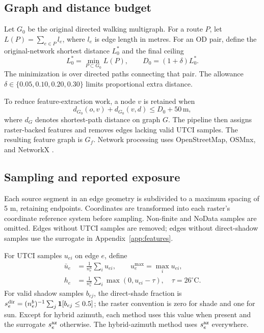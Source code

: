 \documentclass[sigconf,nonacm]{acmart}
\begin{document}
\subsection{Graph and distance budget}
Let $G_0$ be the original directed walking multigraph. For a route $P$, let $L(P)=\sum_{e\in P}l_e$, where $l_e$ is edge length in metres. For an OD pair, define the original-network shortest distance $L_0^*$ and the final ceiling
\begin{equation}
 L_0^*=\min_{P\subset G_0} L(P),\qquad D_0=(1+\delta)L_0^*.
\end{equation}
The minimization is over directed paths connecting that pair. The allowance $\delta\in\{0.05,0.10,0.20,0.30\}$ limits proportional extra distance.

To reduce feature-extraction work, a node $v$ is retained when
\begin{equation}
 d_{G_0}(o,v)+d_{G_0}(v,d)\leq D_0+50\,\mathrm{m},
\end{equation}
where $d_G$ denotes shortest-path distance on graph $G$. The pipeline then assigns raster-backed features and removes edges lacking valid UTCI samples. The resulting feature graph is $G_f$. Network processing uses OpenStreetMap, OSMnx, and NetworkX \citep{osm2026,boeing2017,hagberg2008}.

\subsection{Sampling and reported exposure}
Each source segment in an edge geometry is subdivided to a maximum spacing of 5 m, retaining endpoints. Coordinates are transformed into each raster's coordinate reference system before sampling. Non-finite and NoData samples are omitted. Edges without UTCI samples are removed; edges without direct-shadow samples use the surrogate in Appendix~\ref{app:features}.

For UTCI samples $u_{ei}$ on edge $e$, define
\begin{align}
 \bar u_e&=\frac{1}{n_e^u}\sum_i u_{ei},\qquad u_e^{\max}=\max_i u_{ei},\\
 h_e&=\frac{1}{n_e^u}\sum_i\max(0,u_{ei}-\tau),\quad \tau=26^\circ\mathrm C.
\end{align}
For valid shadow samples $b_{ej}$, the direct-shade fraction is $s_e^{\rm dir}=(n_e^b)^{-1}\sum_j\mathbf1[b_{ej}\leq0.5]$; the raster convention is zero for shade and one for sun. Except for hybrid azimuth, each method uses this value when present and the surrogate $s_e^{\rm az}$ otherwise. The hybrid-azimuth method uses $s_e^{\rm az}$ everywhere.
\end{document}
